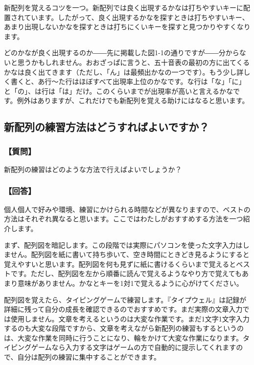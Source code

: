 新配列を覚えるコツを一つ。新配列では良く出現するかなは打ちやすいキーに配置されています。したがって、良く出現するかなを探すときは打ちやすいキー、あまり出現しないかなを探すときは打ちにくいキーを探すと見つかりやすくなります。

どのかなが良く出現するのか――先に掲載した図1-1の通りですが――分からないと思うかもしれません。おおざっぱに言うと、五十音表の最初の方に出てくるかなは良く出てきます（ただし、「ん」は最頻出かなの一つです）。もう少し詳しく書くと、あ行～た行はほぼすべて出現率上位のかなです。な行は「な」「に」と「の」、は行は「は」だけ。このくらいまでが出現率が高いと言えるかなです。例外はありますが、これだけでも新配列を覚える助けにはなると思います。

\subsection{新配列の練習方法はどうすればよいですか？}

\subsubsection*{【質問】}

新配列の練習はどのような方法で行えばよいでしょうか？

\subsubsection*{【回答】}

個人個人で好みや環境、練習にかけられる時間などが異なりますので、ベストの方法はそれぞれ異なると思います。ここではわたしがおすすめする方法を一つ紹介します。

まず、配列図を暗記します。この段階では実際にパソコンを使った文字入力はしません。配列図を紙に書いて持ち歩いて、空き時間にときどき見るようにすると覚えやすいと思います。配列図を何も見ずに紙に書けるくらいまで覚えるとベストです。ただし、配列図を左から順番に読んで覚えるようなやり方で覚えてもあまり意味がありません。かなとキーを1対1で覚えるように心がけてください。

配列図を覚えたら、タイピングゲームで練習します。『タイプウェル』は記録が詳細に残って自分の成長を確認できるのでおすすめです。まだ実際の文章入力では使用しません。文章を考えるというのは大変な作業です。まだ1文字1文字入力するのも大変な段階ですから、文章を考えながら新配列の練習もするというのは、大変な作業を同時に行うことになり、輪をかけて大変な作業になります。タイピングゲームなら入力する文字はゲームの方で自動的に提示してくれますので、自分は配列の練習に集中することができます。

